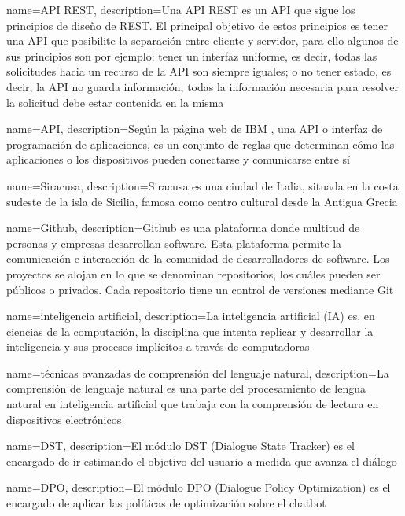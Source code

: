 {
    name=API REST,
    description={Una API REST es un \gls{API} que sigue los principios de diseño de REST. El principal objetivo de estos principios es tener una \gls{API} que posibilite la separación entre cliente y servidor, para ello algunos de sus principios son por ejemplo: tener un interfaz uniforme, es decir, todas las solicitudes hacia un recurso de la API son siempre iguales; o no tener estado, es decir, la API no guarda información, todas la información necesaria para resolver la solicitud debe estar contenida en la misma}
}

{
    name=API,
    description={Según la página web de IBM \cite{RefWorks:RefID:33-2021-API}, una API o interfaz de programación de aplicaciones, es un conjunto de reglas que determinan cómo las aplicaciones o los dispositivos pueden conectarse y comunicarse entre sí}
}

{
    name=Siracusa,
    description={Siracusa es una ciudad de Italia, situada en la costa sudeste de la isla de Sicilia, famosa como centro cultural desde la Antigua Grecia}
}

{
    name=Github,
    description={Github es una plataforma donde multitud de personas y empresas desarrollan software. Esta plataforma permite la comunicación e interacción de la comunidad de desarrolladores de software. Los proyectos se alojan en lo que se denominan repositorios, los cuáles pueden ser públicos o privados. Cada repositorio tiene un control de versiones mediante Git}
}


{
    name=inteligencia artificial,
    description={La inteligencia artificial (IA) es, en ciencias de la computación, la disciplina que intenta replicar y desarrollar la inteligencia y sus procesos implícitos a través de computadoras}
}

{
    name=técnicas avanzadas de comprensión del lenguaje natural,
    description={La comprensión de lenguaje natural es una parte del procesamiento de lengua natural en inteligencia artificial que trabaja con la comprensión de lectura en dispositivos electrónicos}
}

{
    name=DST,
    description={El módulo DST (Dialogue State Tracker) es el encargado de ir estimando el objetivo del usuario a medida que avanza el diálogo}
}

{
    name=DPO,
    description={El módulo DPO (Dialogue Policy Optimization) es el encargado de aplicar las políticas de optimización sobre el chatbot}
}

